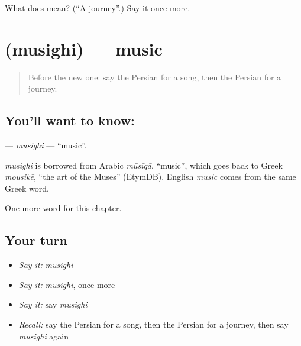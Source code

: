 \begin{tcolorbox}[breakable,colback=teal!4,colframe=teal!35!black,title={Before you move on}]
What does  mean? (\textquotedblleft{}A journey\textquotedblright{}.) Say it once more.
\end{tcolorbox}
\section[\texorpdfstring{\fa{موسیقی} (musighi)}{موسیقی (musighi)}]{ (musighi) — music}

\label{lesson:FA-C78-musighi}



\begin{quote}
Before the new one: say the Persian for a song, then the Persian for a journey.
\end{quote}

\subsection*{You'll want to know: }
\textbf{} — \emph{musighi} — \textquotedblleft{}music\textquotedblright{}.

\begin{cousinweb}
\emph{musighi} is borrowed from Arabic \emph{mūsīqā}, \textquotedblleft{}music\textquotedblright{}, which goes back to Greek \emph{mousikē}, \textquotedblleft{}the art of the Muses\textquotedblright{} (EtymDB). English \emph{music} comes from the same Greek word.
\end{cousinweb}

\begin{grammarlens}[title={What you've built}]
One more word for this chapter.
\end{grammarlens}

\subsection*{Your turn}
\begin{itemize}
\raggedright
  \item \emph{Say it:} \emph{musighi}
  \item \emph{Say it:} \emph{musighi}, once more
  \item \emph{Say it:} say \emph{musighi}
  \item \emph{Recall:} say the Persian for a song, then the Persian for a journey, then say \emph{musighi} again
\end{itemize}

